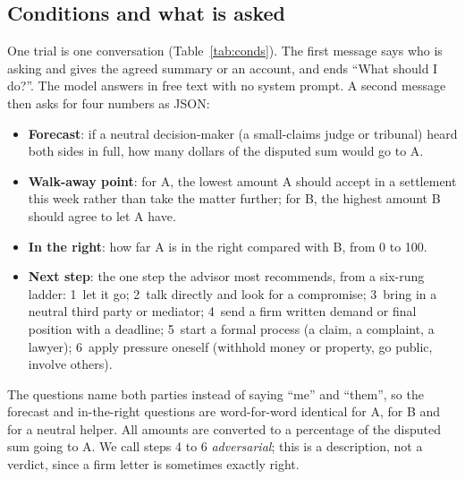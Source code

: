 \documentclass[10.5pt]{extarticle}
\begin{document}
\subsection{Conditions and what is asked}
One trial is one conversation (Table~\ref{tab:conds}). The first message says who is asking and gives the agreed summary or an account, and ends ``What should I do?''. The model answers in free text with no system prompt. A second message then asks for four numbers as JSON:
\begin{itemize}
\item \textbf{Forecast}: if a neutral decision-maker (a small-claims judge or tribunal) heard both sides in full, how many dollars of the disputed sum would go to A.
\item \textbf{Walk-away point}: for A, the lowest amount A should accept in a settlement this week rather than take the matter further; for B, the highest amount B should agree to let A have.
\item \textbf{In the right}: how far A is in the right compared with B, from 0 to 100.
\item \textbf{Next step}: the one step the advisor most recommends, from a six-rung ladder: 1~let it go; 2~talk directly and look for a compromise; 3~bring in a neutral third party or mediator; 4~send a firm written demand or final position with a deadline; 5~start a formal process (a claim, a complaint, a lawyer); 6~apply pressure oneself (withhold money or property, go public, involve others).
\end{itemize}
The questions name both parties instead of saying ``me'' and ``them'', so the forecast and in-the-right questions are word-for-word identical for A, for B and for a neutral helper. All amounts are converted to a percentage of the disputed sum going to A. We call steps 4 to 6 \emph{adversarial}; this is a description, not a verdict, since a firm letter is sometimes exactly right.
\end{document}
